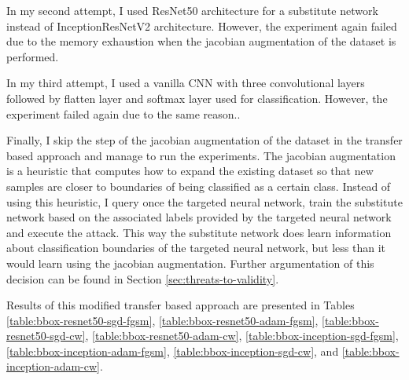 In my second attempt, I used ResNet50 architecture for a substitute network instead of InceptionResNetV2 architecture. However, the experiment again failed  due to the memory exhaustion when the jacobian augmentation of the dataset is performed.  

In my third attempt, I used a vanilla CNN with three convolutional layers followed by flatten layer and softmax layer used for classification. However, the experiment failed again due to the same reason..


Finally, I skip the step of the jacobian augmentation of the dataset in the transfer based approach and manage to run the experiments. The jacobian augmentation is a heuristic that computes how to expand the existing dataset so that new samples are closer to boundaries of being classified as a certain class. Instead of using this heuristic, I query once the targeted neural network, train the substitute network based on the associated labels provided by the targeted neural network and execute the attack. This way the substitute network does learn information about classification boundaries of the targeted neural network, but less than it would learn using the jacobian augmentation. Further argumentation of this decision can be found in Section \ref{sec:threats-to-validity}.

Results of this modified transfer based approach are presented in Tables
\ref{table:bbox-resnet50-sgd-fgsm},
\ref{table:bbox-resnet50-adam-fgsm}, 
\ref{table:bbox-resnet50-sgd-cw},
\ref{table:bbox-resnet50-adam-cw}, 
\ref{table:bbox-inception-sgd-fgsm},
\ref{table:bbox-inception-adam-fgsm}, 
\ref{table:bbox-inception-sgd-cw}, and
\ref{table:bbox-inception-adam-cw}.

\begin{table}[]
\caption{Substitute network: ResNet50 architecture with SGD optimizer; Attack: FGSM}
\label{table:bbox-resnet50-sgd-fgsm}
\end{table}

